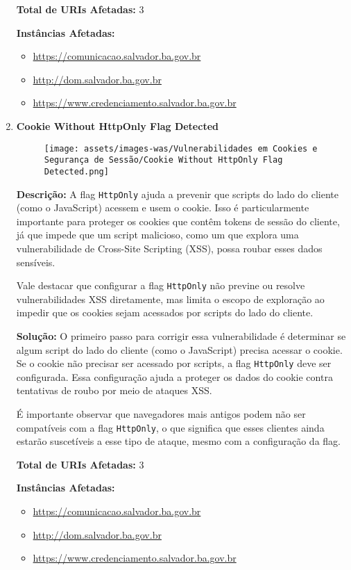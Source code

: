 \documentclass[a4paper,12pt]{article}
\begin{document}
\begin{enumerate}
\textbf{Total de URIs Afetadas:} 3

\textbf{Instâncias Afetadas:}
\begin{itemize}
    \item \url{https://comunicacao.salvador.ba.gov.br}
    \item \url{http://dom.salvador.ba.gov.br}
    \item \url{https://www.credenciamento.salvador.ba.gov.br}
\end{itemize}

\item \textbf{Cookie Without HttpOnly Flag Detected}

                        \begin{figure}[h!]
                        \centering
                        \texttt{[image: assets/images-was/Vulnerabilidades em Cookies e Segurança de Sessão/Cookie Without HttpOnly Flag Detected.png]}
                        \end{figure}
                        \FloatBarrier
                        \textbf{Descrição:} A flag \texttt{HttpOnly} ajuda a prevenir que scripts do lado do cliente (como o JavaScript) acessem e usem o cookie. Isso é particularmente importante para proteger os cookies que contêm tokens de sessão do cliente, já que impede que um script malicioso, como um que explora uma vulnerabilidade de Cross-Site Scripting (XSS), possa roubar esses dados sensíveis.

Vale destacar que configurar a flag \texttt{HttpOnly} não previne ou resolve vulnerabilidades XSS diretamente, mas limita o escopo de exploração ao impedir que os cookies sejam acessados por scripts do lado do cliente.

\textbf{Solução:} O primeiro passo para corrigir essa vulnerabilidade é determinar se algum script do lado do cliente (como o JavaScript) precisa acessar o cookie. Se o cookie não precisar ser acessado por scripts, a flag \texttt{HttpOnly} deve ser configurada. Essa configuração ajuda a proteger os dados do cookie contra tentativas de roubo por meio de ataques XSS.

É importante observar que navegadores mais antigos podem não ser compatíveis com a flag \texttt{HttpOnly}, o que significa que esses clientes ainda estarão suscetíveis a esse tipo de ataque, mesmo com a configuração da flag.

\textbf{Total de URIs Afetadas:} 3

\textbf{Instâncias Afetadas:}
\begin{itemize}
    \item \url{https://comunicacao.salvador.ba.gov.br}
    \item \url{http://dom.salvador.ba.gov.br}
    \item \url{https://www.credenciamento.salvador.ba.gov.br}
\end{itemize}

\end{enumerate}
\end{document}
